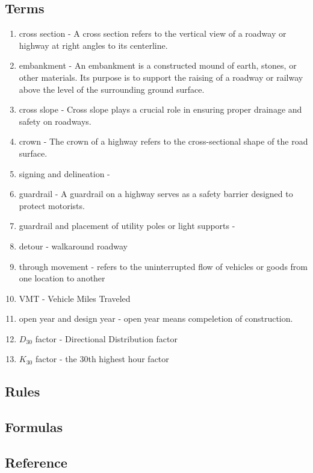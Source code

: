 \documentclass{article}
\begin{document}
  \subsection{Terms}
  \begin{enumerate}
    \item cross section - A cross section refers to the vertical view of a roadway or highway at right angles to its centerline. 
    \item embankment - An embankment is a constructed mound of earth, stones, or other materials. Its purpose is to support the raising of a roadway or railway above the level of the surrounding ground surface.
    \item cross slope - Cross slope plays a crucial role in ensuring proper drainage and safety on roadways.
    \item crown - The crown of a highway refers to the cross-sectional shape of the road surface.
    \item signing and delineation -  
    \item guardrail - A guardrail on a highway serves as a safety barrier designed to protect motorists.
    \item guardrail and placement of utility poles or light supports - 
    \item  detour - walkaround roadway  
    \item through movement - refers to the uninterrupted flow of vehicles or goods from one location to another 
    \item VMT - Vehicle Miles Traveled
    \item open year and design year - open year means compeletion of construction. 
    \item $D_{30}$ factor - Directional Distribution factor 
    \item $K_{30}$ factor - the 30th highest hour factor 
  \end{enumerate}


  \subsection{Rules}

  \subsection{Formulas}


  \subsection{Reference}

  \newpage





\end{document}
